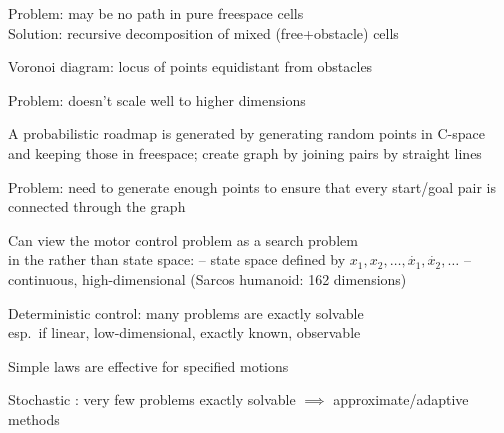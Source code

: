 \documentclass{article}
\begin{document}
\begin{huge}
\vspace*{0.2in}

\centerline{\qquad{}}

Problem: may be no path in pure freespace cells\\
Solution: recursive decomposition of mixed (free+obstacle) cells



Voronoi diagram: locus of points equidistant from obstacles

\vspace*{0.2in}

\textwidth
{}

Problem: doesn't scale well to higher dimensions


A probabilistic roadmap is generated by generating random points in
C-space and keeping those in freespace; create graph by joining
pairs by straight lines

\vspace*{0.2in}

\textwidth
{}

Problem: need to generate enough points to ensure that every
start/goal pair is connected through the graph


Can view the motor control problem as a search problem\\
in the  rather than  state space:\al
-- state space defined by $x_1,x_2,\ldots,\dot{x_1},\dot{x_2},\ldots$\al
-- continuous, high-dimensional (Sarcos humanoid: 162 dimensions)

Deterministic control: many problems are exactly solvable\\
esp.~if linear, low-dimensional, exactly known, observable

Simple  laws are effective for specified motions

Stochastic : very few problems exactly solvable\al
$\implies$ approximate/adaptive methods





\end{huge}
\end{document}
